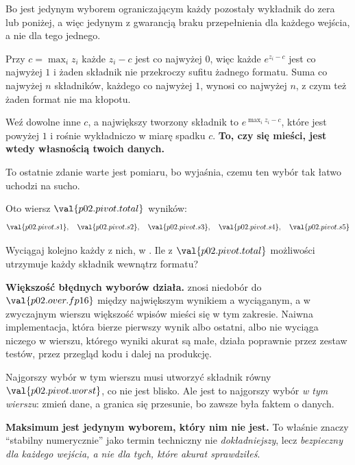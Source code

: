 \begin{fr}
\begin{ansblock}
Bo jest jedynym wyborem ograniczającym każdy pozostały wykładnik do zera lub
poniżej, a więc jedynym z gwarancją braku przepełnienia \dash{} dla każdego
wejścia, a nie dla tego jednego.
\end{ansblock}

Przy $c = \max_i z_i$ każde $z_i - c$ jest co najwyżej $0$, więc każde
$e^{z_i - c}$ jest co najwyżej $1$ i żaden składnik nie przekroczy sufitu
żadnego formatu. Suma co najwyżej $n$ składników, każdego co najwyżej $1$,
wynosi co najwyżej $n$, z czym też żaden format nie ma kłopotu.

Weź dowolne inne $c$, a największy tworzony składnik to $e^{\max_i z_i - c}$,
które jest powyżej $1$ i rośnie wykładniczo w miarę spadku $c$. \textbf{To, czy
się mieści, jest wtedy własnością twoich danych.}
\end{fr}


\begin{fr}
To ostatnie zdanie warte jest pomiaru, bo wyjaśnia, czemu ten wybór tak łatwo
uchodzi na sucho.

Oto wiersz $\val{p02.pivot.total}$ wyników:
\[ \val{p02.pivot.s1}, \quad \val{p02.pivot.s2}, \quad
   \val{p02.pivot.s3}, \quad \val{p02.pivot.s4}, \quad \val{p02.pivot.s5} \]

Wyciągaj kolejno każdy z nich, w . Ile z
$\val{p02.pivot.total}$ możliwości utrzymuje każdy składnik wewnątrz formatu?
\nextframe
\end{fr}

\begin{fr}
\begin{trapbox}
\textbf{Większość błędnych wyborów działa.}  znosi niedobór do
$\val{p02.over.fp16}$ między największym wynikiem a wyciąganym, a w zwyczajnym
wierszu większość wpisów mieści się w tym zakresie. Naiwna implementacja, która
bierze pierwszy wynik albo ostatni, albo nie wyciąga niczego w wierszu, którego
wyniki akurat są małe, działa poprawnie \dash{} przez zestaw testów, przez
przegląd kodu i dalej na produkcję.

Najgorszy wybór w tym wierszu musi utworzyć składnik równy
$\val{p02.pivot.worst}$, co nie jest blisko. Ale jest to najgorszy wybór
\emph{w tym wierszu}: zmień dane, a granica się przesunie, bo zawsze była
faktem o danych.

\textbf{Maksimum jest jedynym wyborem, który nim nie jest.} To właśnie znaczy
\enquote{stabilny numerycznie} jako termin techniczny \dash{} nie
\emph{dokładniejszy}, lecz \emph{bezpieczny dla każdego wejścia, a nie dla
tych, które akurat sprawdziłeś}.
\end{trapbox}
\end{fr}

